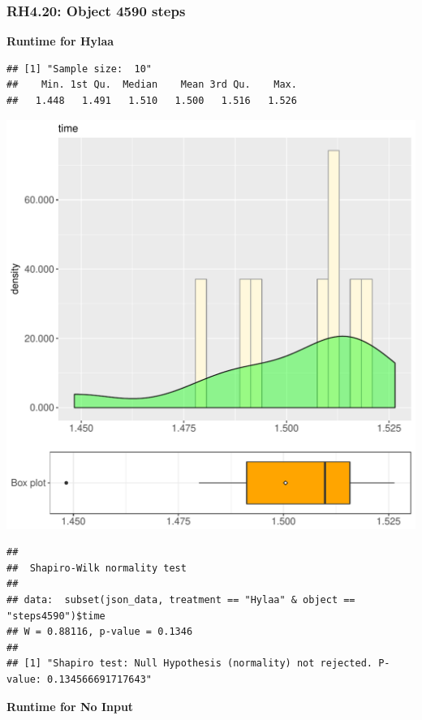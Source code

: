 \documentclass{article}\usepackage[]{graphicx}\usepackage[]{color}
\makeatletter
\def\maxwidth{ %
  \ifdim\Gin@nat@width>\linewidth
    \linewidth
  \else
    \Gin@nat@width
  \fi
}
\newenvironment{kframe}{%
 \def\at@end@of@kframe{}%
 \ifinner\ifhmode%
  \def\at@end@of@kframe{\end{minipage}}%
  \begin{minipage}{\columnwidth}%
 \fi\fi%
 \def\FrameCommand##1{\hskip\@totalleftmargin \hskip-\fboxsep
 \colorbox{shadecolor}{##1}\hskip-\fboxsep
     \hskip-\linewidth \hskip-\@totalleftmargin \hskip\columnwidth}%
 \MakeFramed {\advance\hsize-\width
   \@totalleftmargin\z@ \linewidth\hsize
   \@setminipage}}%
 {\par\unskip\endMakeFramed%
 \at@end@of@kframe}
\newenvironment{knitrout}{}{} %
\makeatother
\begin{document}
\subsubsection{RH4.20: Object 4590 steps}

 \textbf{Runtime for Hylaa}
\begin{knitrout}
\color{fgcolor}\begin{kframe}
\begin{verbatim}
## [1] "Sample size:  10"
##    Min. 1st Qu.  Median    Mean 3rd Qu.    Max. 
##   1.448   1.491   1.510   1.500   1.516   1.526
\end{verbatim}
\end{kframe}
\includegraphics[width=\maxwidth]{figure/RH4_Hylaa_steps4590-1} 
\begin{kframe}\begin{verbatim}
## 
## 	Shapiro-Wilk normality test
## 
## data:  subset(json_data, treatment == "Hylaa" & object == "steps4590")$time
## W = 0.88116, p-value = 0.1346
## 
## [1] "Shapiro test: Null Hypothesis (normality) not rejected. P-value: 0.134566691717643"
\end{verbatim}
\end{kframe}
\end{knitrout}
 \textbf{Runtime for No Input}
\end{document}
